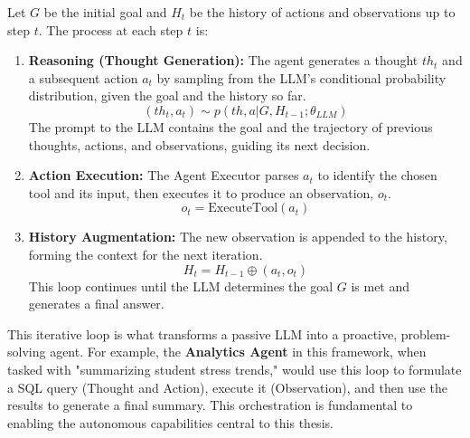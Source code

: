 Let $G$ be the initial goal and $H_t$ be the history of actions and observations up to step $t$. The process at each step $t$ is:
\begin{enumerate}
    \item \textbf{Reasoning (Thought Generation):} The agent generates a thought $th_t$ and a subsequent action $a_t$ by sampling from the LLM's conditional probability distribution, given the goal and the history so far.
    $$ (th_t, a_t) \sim p(th, a | G, H_{t-1}; \theta_{LLM}) $$
    The prompt to the LLM contains the goal and the trajectory of previous thoughts, actions, and observations, guiding its next decision.

    \item \textbf{Action Execution:} The Agent Executor parses $a_t$ to identify the chosen tool and its input, then executes it to produce an observation, $o_t$.
    $$ o_t = \text{ExecuteTool}(a_t) $$

    \item \textbf{History Augmentation:} The new observation is appended to the history, forming the context for the next iteration.
    $$ H_t = H_{t-1} \oplus (a_t, o_t) $$
    This loop continues until the LLM determines the goal $G$ is met and generates a final answer.
\end{enumerate}
This iterative loop is what transforms a passive LLM into a proactive, problem-solving agent. For example, the \textbf{Analytics Agent} in this framework, when tasked with "summarizing student stress trends," would use this loop to formulate a SQL query (Thought and Action), execute it (Observation), and then use the results to generate a final summary. This orchestration is fundamental to enabling the autonomous capabilities central to this thesis.



